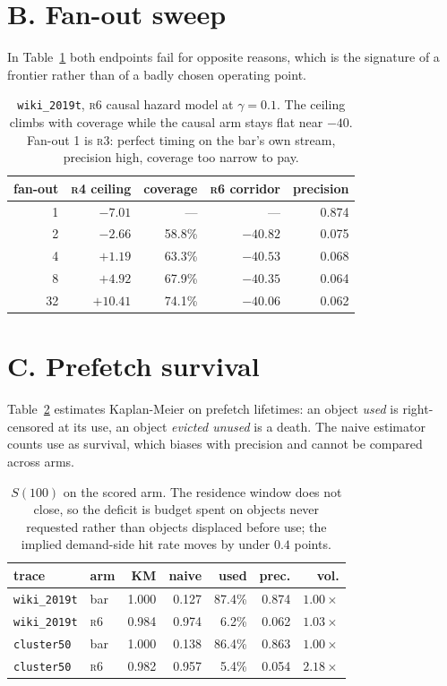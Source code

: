 \documentclass[letterpaper]{article} %
\newcommand{\rung}[1]{\textsc{#1}}
\begin{document}
\section{B. Fan-out sweep}

\noindent In Table~\ref{tab:s-fanout} both endpoints fail for opposite reasons, which is the signature of a frontier rather than
of a badly chosen operating point.

\begin{table}[htbp]
\centering\footnotesize
\setlength{\tabcolsep}{3pt}
\begin{tabular}{rrrrr}
\toprule
fan-out & \rung{r4} ceiling & coverage & \rung{r6} corridor & precision \\
\midrule
1  & $-7.01$ & --- & --- & 0.874 \\
2  & $-2.66$ & 58.8\% & $-40.82$ & 0.075 \\
4  & $+1.19$ & 63.3\% & $-40.53$ & 0.068 \\
8  & $+4.92$ & 67.9\% & $-40.35$ & 0.064 \\
32 & $+10.41$ & 74.1\% & $-40.06$ & 0.062 \\
\bottomrule
\end{tabular}
\caption{\texttt{wiki\_2019t}, \rung{r6} causal hazard model at $\gamma{=}0.1$. The ceiling climbs
with coverage while the causal arm stays flat near $-40$. Fan-out 1 is \rung{r3}: perfect timing on
the bar's own stream, precision high, coverage too narrow to pay.}
\label{tab:s-fanout}
\end{table}

\section{C. Prefetch survival}

\noindent Table~\ref{tab:s-surv} estimates Kaplan-Meier on prefetch lifetimes: an object \emph{used} is right-censored at its use, an
object \emph{evicted unused} is a death. The naive estimator counts use as survival, which biases
with precision and cannot be compared across arms.

\begin{table}[htbp]
\centering\footnotesize
\setlength{\tabcolsep}{3pt}
\begin{tabular}{llrrrrr}
\toprule
trace & arm & KM & naive & used & prec. & vol. \\
\midrule
\texttt{wiki\_2019t} & bar & 1.000 & 0.127 & 87.4\% & 0.874 & $1.00\times$ \\
\texttt{wiki\_2019t} & \rung{r6} & 0.984 & 0.974 & 6.2\% & 0.062 & $1.03\times$ \\
\texttt{cluster50} & bar & 1.000 & 0.138 & 86.4\% & 0.863 & $1.00\times$ \\
\texttt{cluster50} & \rung{r6} & 0.982 & 0.957 & 5.4\% & 0.054 & $2.18\times$ \\
\bottomrule
\end{tabular}
\caption{$S(100)$ on the scored arm. The residence window does not close, so the deficit is budget
spent on objects never requested rather than objects displaced before use; the implied demand-side
hit rate moves by under $0.4$ points.}
\label{tab:s-surv}
\end{table}
\end{document}
